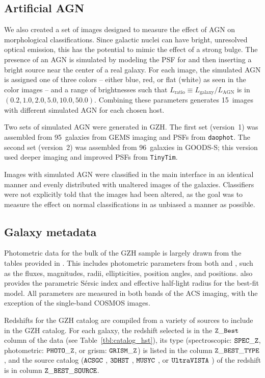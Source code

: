 \documentclass[usenatbib]{mn2e}
\begin{document}
\subsection{Artificial AGN}

We also created a set of images designed to measure the effect of AGN on morphological classifications. Since galactic nuclei can have bright, unresolved optical emission, this has the potential to mimic the effect of a strong bulge. The presence of an AGN is simulated by modeling the PSF for \hst{} and then inserting a bright source near the center of a real galaxy. For each image, the simulated AGN is assigned one of three colors -- either blue, red, or flat (white) as seen in the color images -- and a range of brightnesses such that $L_\mathrm{ratio} \equiv L_\mathrm{galaxy}/L_\mathrm{AGN}$ is in $(0.2,1.0,2.0,5.0,10.0,50.0)$. Combining these parameters generates 15~images with different simulated AGN for each chosen host. 

Two sets of simulated AGN were generated in GZH. The first set (version~1) was assembled from 95~galaxies from GEMS imaging and PSFs from \texttt{daophot}. The second set (version~2) was assembled from 96~galaxies in GOODS-S; this version used deeper imaging and improved PSFs from \texttt{TinyTim}. 

Images with simulated AGN were classified in the main interface in an identical manner and evenly distributed with unaltered images of the galaxies. Classifiers were not explicitly told that the images had been altered, as the goal was to measure the effect on normal classifications in as unbiased a manner as possible. 

\subsection{Galaxy metadata}

Photometric data for the bulk of the GZH sample is largely drawn from the tables provided in \citet{gri12}. This includes photometric parameters from both \sextractor{} and \galfit, such as the fluxes, magnitudes, radii, ellipticities, position angles, and positions. \galfit{} also provides the parametric S\'{e}rsic index and effective half-light radius for the best-fit model. All parameters are measured in both bands of the ACS imaging, with the exception of the single-band COSMOS images.

Redshifts for the GZH catalog are compiled from a variety of sources to include in the GZH catalog. For each galaxy, the redshift selected is in the $\tt Z\_Best$ column of the data (see Table~\ref{tbl:catalog_hst}), its type (spectroscopic: $\tt SPEC\_Z$, photometric: $\tt PHOTO\_Z$, or grism: $ \tt GRISM\_Z$) is listed in the column $\tt Z\_BEST\_TYPE$, and the source catalog ($\tt ACSGC$ \citep{gri12}, $\tt 3DHST$ \citep{mom15}, $\tt MUSYC$ \citep{car10}, or $\tt UltraVISTA$ \citep{ilb13}) of the redshift is in column $\tt Z\_BEST\_SOURCE$.
\end{document}
